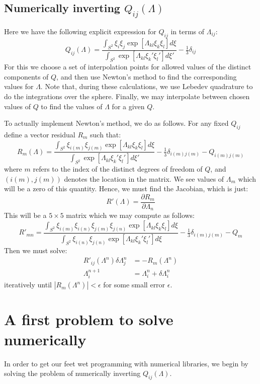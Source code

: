 \documentclass[reqno]{article}
\begin{document}
	\subsection{Numerically inverting $Q_{ij} (\Lambda)$}
	Here we have the following explicit expression for $Q_{ij}$ in terms of $\Lambda_{ij}$:
	\begin{equation}
		Q_{ij} (\Lambda)
		= \frac{\int_{S^2} \xi_i \xi_j \exp\left[\Lambda_{kl} \xi_k \xi_l \right] d \xi}
		{\int_{S^2} \exp\left[\Lambda_{kl} \xi_k' \xi_l'\right] d\xi'}
		- \tfrac13 \delta_{ij}
	\end{equation}
	For this we choose a set of interpolation points for allowed values of the distinct components of $Q$, and then use Newton's method to find the corresponding values for $\Lambda$.
	Note that, during these calculations, we use Lebedev quadrature to do the integrations over the sphere.
	Finally, we may interpolate between chosen values of $Q$ to find the values of $\Lambda$ for a given $Q$.
	
	To actually implement Newton's method, we do as follows.
	For any fixed $Q_{ij}$ define a vector residual $R_m$ such that:
	\begin{equation}
		R_m (\Lambda)
		= \frac{\int_{S^2} \xi_{i(m)} \xi_{j(m)} \exp\left[\Lambda_{kl} \xi_k \xi_l \right] d \xi}
		{\int_{S^2} \exp\left[\Lambda_{kl} \xi_k' \xi_l'\right] d\xi'}
		- \tfrac13 \delta_{i(m) j(m)}
		- Q_{i(m) j(m)}
	\end{equation}
	where $m$ refers to the index of the distinct degrees of freedom of $Q$, and $(i(m), j(m))$ denotes the location in the matrix.
	We see values of $\Lambda_m$ which will be a zero of this quantity.
	Hence, we must find the Jacobian, which is just:
	\begin{equation}
		R'(\Lambda) = \frac{\partial R_m}{\partial \Lambda_n}
	\end{equation}
	This will be a $5\times 5$ matrix which we may compute as follows:
	\begin{equation}
		R'_{mn} 
		= \frac{\int_{S^2} \xi_{i(m)} \xi_{i(n)} \xi_{j(m)} \xi_{j(n)} \exp\left[\Lambda_{kl} \xi_k \xi_l\right] d\xi}{\int_{S^2} \xi_{i(n)} \xi_{j(n)} \exp\left[\Lambda_{kl} \xi_k' \xi_l'\right] d\xi}
		- \tfrac13 \delta_{i(m) j(m)}
		- Q_m
	\end{equation}
	Then we must solve:
	\begin{align}
		R'_{ij} (\Lambda^n) \delta \Lambda^n_j &= -R_m (\Lambda^n) \\
		\Lambda^{n + 1}_{i} &= \Lambda^n_{i} + \delta \Lambda^n_i
	\end{align}
	iteratively until $\left| R_m (\Lambda^n) \right| < \epsilon$ for some small error $\epsilon$.
	
	\section{A first problem to solve numerically}
	In order to get our feet wet programming with numerical libraries, we begin by solving the problem of numerically inverting $Q_{ij} (\Lambda)$.
	
	
	
\end{document}
